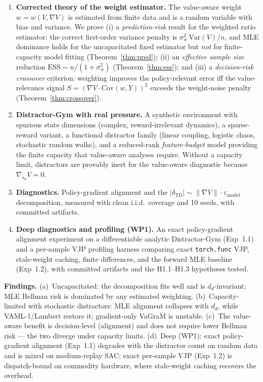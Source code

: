 \documentclass[11pt]{article}
\begin{document}
\begin{enumerate}
\item \textbf{Corrected theory of the weight estimator.} The value-aware weight
  $w = w(V, \nabla V)$ is estimated from finite data and is a random variable with bias
  and variance. We prove (i) a \emph{prediction-risk} result for the weighted ratio
  estimator: the correct first-order variance penalty is
  $\sigma_w^2\,\mathrm{Var}(V)/n$, and MLE dominance holds for the uncapacitated fixed
  estimator but \emph{not} for finite-capacity model fitting (Theorem~\ref{thm:pred});
  (ii) an \emph{effective sample size} reduction $\mathrm{ESS} \sim n/(1+\sigma_w^2)$
  (Theorem~\ref{thm:ess}); and (iii) a \emph{decision-risk crossover} criterion:
  weighting improves the policy-relevant error iff the value-relevance signal
  $S = \left(\nabla V \cdot \mathrm{Cov}(w, Y)\right)^2$ exceeds the weight-noise penalty
  (Theorem~\ref{thm:crossover}).
\item \textbf{Distractor-Gym with real pressure.} A synthetic environment with spurious
  state dimensions (complex, reward-irrelevant dynamics), a sparse-reward variant, a
  functional distractor family (linear coupling, logistic chaos, stochastic random
  walks), and a reduced-rank \emph{feature-budget} model providing the finite capacity
  that value-aware analyses require. Without a capacity limit, distractors are provably
  inert for the value-aware diagnostic because $\nabla_{s_d} V = 0$.
\item \textbf{Diagnostics.} Policy-gradient alignment and the
  $\lvert\delta_{\mathrm{TD}}\rvert \sim \lVert \nabla V\rVert \cdot \varepsilon_{\mathrm{model}}$
  decomposition, measured with clean i.i.d.\ coverage and 10 seeds, with committed
  artifacts.
\item \textbf{Deep diagnostics and profiling (WP1).} An exact policy-gradient alignment
  experiment on a differentiable analytic Distractor-Gym (Exp~1.1) and a per-sample VJP
  profiling harness comparing exact \texttt{torch.func} VJP, stale-weight caching, finite
  differences, and the forward MLE baseline (Exp~1.2), with committed artifacts and the
  H1.1--H1.3 hypotheses tested.
\end{enumerate}

\textbf{Findings.}
(a)~Uncapacitated: the decomposition fits well and is $d_d$-invariant; MLE Bellman risk
is dominated by any estimated weighting.
(b)~Capacity-limited with stochastic distractors: MLE alignment collapses with $d_d$,
while VAML-1/Lambert restore it; gradient-only VaGraM is unstable.
(c)~The value-aware benefit is decision-level (alignment) and does not require lower
Bellman risk --- the two diverge under capacity limits.
(d)~Deep (WP1): exact policy-gradient alignment (Exp~1.1) degrades with the distractor
count on random data and is mixed on medium-replay SAC; exact per-sample VJP (Exp~1.2) is
dispatch-bound on commodity hardware, where stale-weight caching recovers the overhead.
\end{document}
